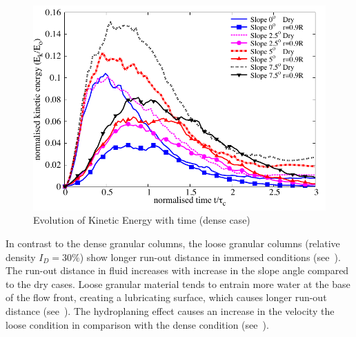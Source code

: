 \begin{figure}
\centering
\includegraphics[width=0.97\columnwidth]{KE_dense}
\caption{Evolution of Kinetic Energy with time (dense case)}
\label{fig:KE_dense}
\end{figure}


%

In contrast to the dense granular columns, the loose granular columns (relative density $I_D=30 \%$) show longer run-out distance in immersed conditions (see~). The run-out distance in fluid increases with increase in the slope angle compared to the dry cases. Loose granular material tends to entrain more water at the base of the flow front, creating a lubricating surface, which causes longer run-out distance (see~). The hydroplaning effect causes an increase in the velocity the loose condition in comparison with the dense condition (see~).

